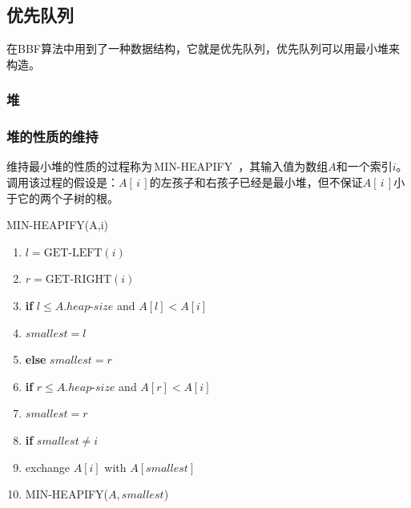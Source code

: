 \documentclass[10.5pt,a4paper]{article}
\numberwithin{equation}{section}
\numberwithin{figure}{section}
\numberwithin{table}{section}
\begin{document}
\subsection{优先队列}
在BBF算法中用到了一种数据结构，它就是优先队列，优先队列可以用最小堆来构造\cite{cormen2009introduction}。
\subsubsection{堆}
\subsubsection{堆的性质的维持}
维持最小堆的性质的过程称为\,MIN-HEAPIFY\ ，其输入值为数组$A$和一个索引$i$。调用该过程的假设是：$A[\,i\,]$的左孩子和右孩子已经是最小堆，但不保证$A[\,i\,]$小于它的两个子树的根。\par
\noindent
MIN-HEAPIFY(A,i)
\begin{enumerate}
\item $l = \text{GET-LEFT}(i) $
\item $r = \text{GET-RIGHT}(i) $
\item {\bf if} $l \le A.heap\text{-}size$ and $A[l] < A[i]$
\item \hspace{2em} $smallest = l$
\item {\bf else} $smallest = r$
\item {\bf if} $r \le A.heap\text{-}size$ and $A[r] < A[i]$
\item \hspace{2em}  $smallest = r$
\item {\bf if} $smallest \ne i$
\item exchange $A[i]$ with $A[smallest]$
\item MIN-HEAPIFY($A, smallest$)
\end{enumerate}
\newpage
\end{document}
